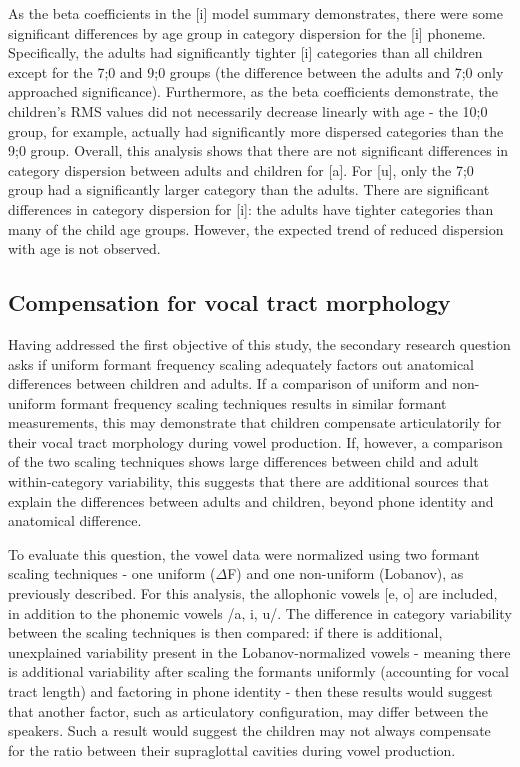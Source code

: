 \documentclass[
]{article}
\begin{document}
As the beta coefficients in the {[}i{]} model summary demonstrates, there were some significant differences by age group in category dispersion for the {[}i{]} phoneme. Specifically, the adults had significantly tighter {[}i{]} categories than all children except for the 7;0 and 9;0 groups (the difference between the adults and 7;0 only approached significance). Furthermore, as the beta coefficients demonstrate, the children's RMS values did not necessarily decrease linearly with age - the 10;0 group, for example, actually had significantly more dispersed categories than the 9;0 group.
Overall, this analysis shows that there are not significant differences in category dispersion between adults and children for {[}a{]}. For {[}u{]}, only the 7;0 group had a significantly larger category than the adults. There are significant differences in category dispersion for {[}i{]}: the adults have tighter categories than many of the child age groups. However, the expected trend of reduced dispersion with age is not observed.

\hypertarget{compensation-for-vocal-tract-morphology}{%
\subsection{Compensation for vocal tract morphology}\label{compensation-for-vocal-tract-morphology}}

Having addressed the first objective of this study, the secondary research question asks if uniform formant frequency scaling adequately factors out anatomical differences between children and adults. If a comparison of uniform and non-uniform formant frequency scaling techniques results in similar formant measurements, this may demonstrate that children compensate articulatorily for their vocal tract morphology during vowel production. If, however, a comparison of the two scaling techniques shows large differences between child and adult within-category variability, this suggests that there are additional sources that explain the differences between adults and children, beyond phone identity and anatomical difference.

To evaluate this question, the vowel data were normalized using two formant scaling techniques - one uniform (\(\Delta\)F) and one non-uniform (Lobanov), as previously described. For this analysis, the allophonic vowels {[}e, o{]} are included, in addition to the phonemic vowels /a, i, u/. The difference in category variability between the scaling techniques is then compared: if there is additional, unexplained variability present in the Lobanov-normalized vowels - meaning there is additional variability after scaling the formants uniformly (accounting for vocal tract length) and factoring in phone identity - then these results would suggest that another factor, such as articulatory configuration, may differ between the speakers. Such a result would suggest the children may not always compensate for the ratio between their supraglottal cavities during vowel production.
\end{document}
